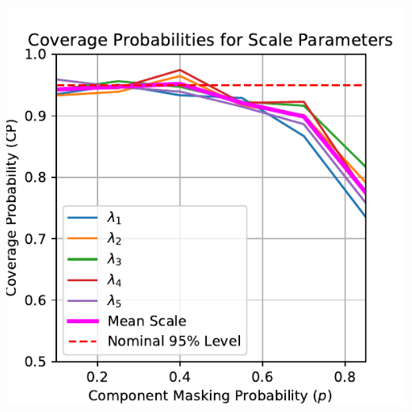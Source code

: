 \documentclass{article}
\begin{document}
\begin{minipage}[t]{0.5\textwidth}
  \vspace{0.5mm}
  \includegraphics[width=\textwidth,height=0.33\textheight,keepaspectratio]{scales-cp.pdf}
\end{minipage}
\end{document}
